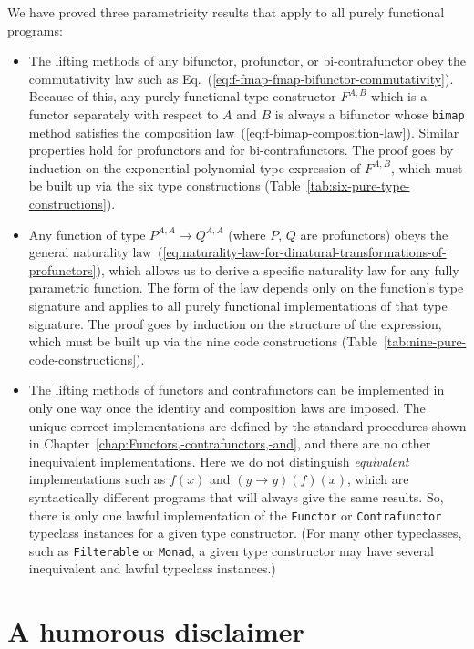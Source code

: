 We have proved three parametricity results that apply to all purely
functional programs:
\begin{itemize}
\item The lifting methods of any bifunctor, profunctor, or bi-contrafunctor
obey the commutativity law such as Eq.~(\ref{eq:f-fmap-fmap-bifunctor-commutativity}).
Because of this, any purely functional type constructor $F^{A,B}$
which is a functor separately with respect to $A$ and $B$ is always
a bifunctor whose \lstinline!bimap! method satisfies the composition
law~(\ref{eq:f-bimap-composition-law}). Similar properties hold
for profunctors and for bi-contrafunctors. The proof goes by induction
on the exponential-polynomial type expression of $F^{A,B}$, which
must be built up via the six type constructions (Table~\ref{tab:six-pure-type-constructions}).
\item Any function of type $P^{A,A}\rightarrow Q^{A,A}$ (where $P$, $Q$
are profunctors) obeys the general naturality law~(\ref{eq:naturality-law-for-dinatural-transformations-of-profunctors}),
which allows us to derive a specific naturality law for any fully
parametric function. The form of the law depends only on the function\textsf{'}s
type signature and applies to all purely functional implementations
of that type signature. The proof goes by induction on the structure
of the expression, which must be built up via the nine code constructions
(Table~\ref{tab:nine-pure-code-constructions}).
\item The lifting methods of functors and contrafunctors can be implemented
in only one way once the identity and composition laws are imposed.
The unique correct implementations are defined by the standard procedures
shown in Chapter~\ref{chap:Functors,-contrafunctors,-and}, and there
are no other inequivalent implementations. Here we do not distinguish
\emph{equivalent} implementations such as $f(x)$ and $(y\rightarrow y)(f)(x)$,
which are syntactically different programs that will always give the
same results. So, there is only one lawful implementation of the \lstinline!Functor!
or \lstinline!Contrafunctor! typeclass instances for a given type
constructor. (For many other typeclasses, such as \lstinline!Filterable!
or \lstinline!Monad!, a given type constructor may have several inequivalent
and lawful typeclass instances.)
\end{itemize}

\chapter{A humorous disclaimer}

